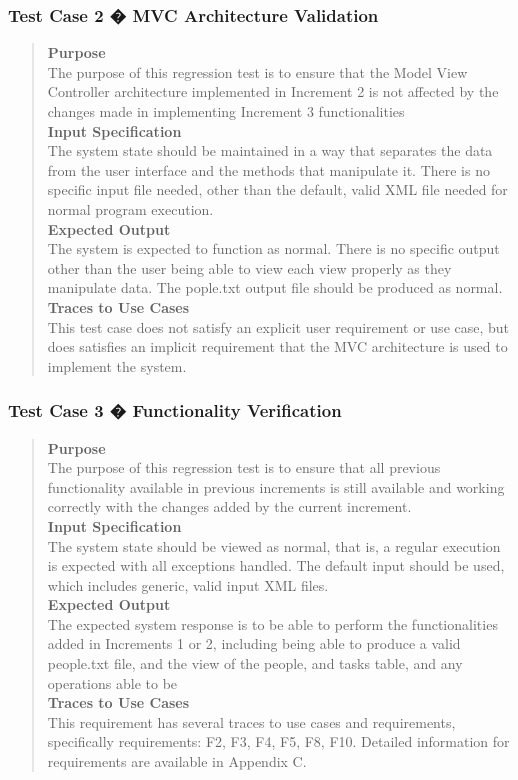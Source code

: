 \documentclass[12pt]{article}
\begin{document}
\subsubsection {Test Case 2 � MVC Architecture Validation}
\begin{quote}
{\bf Purpose}
\\
{
The purpose of this regression test is to ensure that the Model View Controller architecture implemented in Increment 2 is not affected by the changes made in implementing Increment 3 functionalities
}
\\
{\bf Input Specification}
\\
{
The system state should be maintained in a way that separates the data from the user interface and the methods that manipulate it. There is no specific input file needed, other than the default, valid XML file needed for normal program execution.
}
\\
{\bf Expected Output}
\\
{
The system is expected to function as normal. There is no specific output other than the user being able to view each view properly as they manipulate data. The pople.txt output file should be produced as normal.
}
\\
{\bf Traces to Use Cases}
\\
{
This test case does not satisfy an explicit user requirement or use case, but does satisfies an implicit requirement that the MVC architecture is used to implement the system.
}
\end{quote}
\subsubsection{Test Case 3 � Functionality Verification}
\begin{quote}
{\bf Purpose}
\\
{
The purpose of this regression test is to ensure that all previous functionality available in previous increments is still available and working correctly with the changes added by the current increment.
}
\\
{\bf Input Specification}
\\
{
The system state should be viewed as normal, that is, a regular execution is expected with all exceptions handled. The default input should be used, which includes generic, valid input XML files.
}
\\
{\bf Expected Output}
\\
{
The expected system response is to be able to perform the functionalities added in Increments 1 or 2, including being able to produce a valid people.txt file, and the view of the people, and tasks table, and any operations able to be
}
\\
{\bf Traces to Use Cases}
\\
{
This requirement has several traces to use cases and requirements, specifically requirements: F2, F3, F4, F5, F8, F10. Detailed information for requirements are available in Appendix C.
}
\end{quote}
\end{document}
